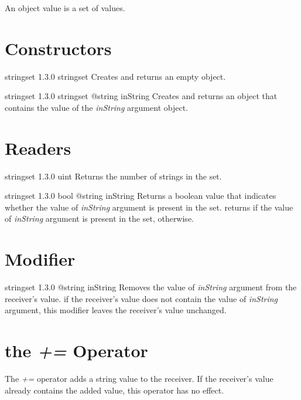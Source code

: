 

An  object value is a set of  values.\\

\section{Constructors}

{stringset}
{1.3.0}
{stringset}
{Creates and returns an empty  object.}
{}

{stringset}
{1.3.0}
{stringset}
{@string inString}
{Creates and returns an  object that contains the value of the \emph{inString} argument object.}
{}

\section{Readers}

{stringset}
{1.3.0}
{uint}
{Returns the number of strings in the set.}
{}



{stringset}
{1.3.0}
{bool}
{@string inString}
{Returns a boolean value that indicates whether the value of \emph{inString} argument is present in the set.}
{returns  if the value of \emph{inString} argument is present in the set,  otherwise.}


\section{Modifier}

{stringset}
{1.3.0}
{@string inString}
{Removes the value of \emph{inString} argument from the receiver's value.}
{if the receiver's value does not contain the value of \emph{inString} argument, this modifier leaves the receiver's value unchanged.}






\section{the \emph{+=} Operator}

The \emph{+=} operator adds a string value to the receiver. If the receiver's value already contains the added value, this operator has no effect.

